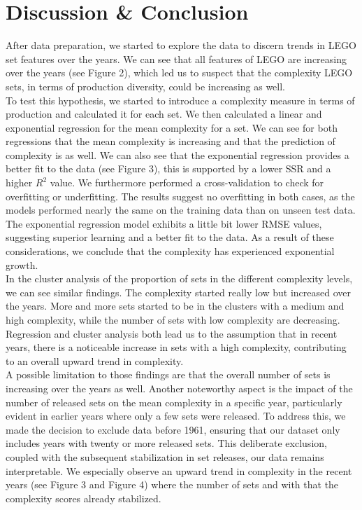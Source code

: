 \documentclass{article}
\theoremstyle{plain}
\theoremstyle{definition}
\theoremstyle{remark}
\begin{document}
\section{Discussion \& Conclusion}\label{sec:conclusion}

After data preparation, we started to explore the data to discern trends in LEGO set features over the years. We can see that all features of LEGO are increasing over the years (see Figure 2), which led us to suspect that the complexity LEGO sets, in terms of production diversity, could be increasing as well. \\
To test this hypothesis, we started to introduce a complexity measure in terms of production and calculated it for each set. We then calculated a linear and exponential regression for the mean complexity for a set. We can see for both regressions that the mean complexity is increasing and that the prediction of complexity is as well. We can also see that the exponential regression provides a better fit to the data (see Figure 3), this is supported by a lower SSR and a higher $R^2$ value. We furthermore performed a cross-validation to check for overfitting or underfitting. The results suggest no overfitting in both cases, as the models performed nearly the same on the training data than on unseen test data. The exponential regression model exhibits a little bit lower RMSE values, suggesting superior learning and a better fit to the data. As a result of these considerations, we conclude that the complexity has experienced exponential growth.\\
In the cluster analysis of the proportion of sets in the different complexity levels, we can see similar findings. The complexity started really low but increased over the years. More and more sets started to be in the clusters with a medium and high complexity, while the number of sets with low complexity are decreasing. 
Regression and cluster analysis both lead us to the assumption that in recent years, there is a noticeable increase in sets with a high complexity, contributing to an overall upward trend in complexity.\\
A possible limitation to those findings are that the overall number of sets is increasing over the years as well. Another noteworthy aspect is the impact of the number of released sets on the mean complexity in a specific year, particularly evident in earlier years where only a few sets were released.  To address this, we made the decision to exclude data before 1961, ensuring that our dataset only includes years with twenty or more released sets. This deliberate exclusion, coupled with the subsequent stabilization in set releases, our data remains interpretable. We especially observe an upward trend in complexity in the recent years (see Figure 3 and Figure 4) where the number of sets and with that the complexity scores already stabilized. 
\end{document}
